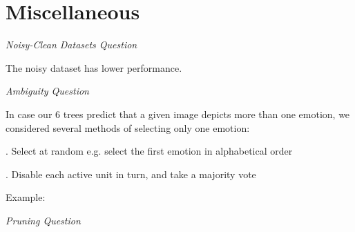 \documentclass[12pt, a4paper]{article}
\begin{document}
\section*{Miscellaneous}
\textit{Noisy-Clean Datasets Question}\par
\bigskip
The noisy dataset has lower performance.\par
\bigskip
\textit{Ambiguity Question}\par
\bigskip
In case our 6 trees predict that a given image depicts more than one emotion, we considered several methods of selecting only one emotion:\par
{}. Select at random e.g. select the first emotion in alphabetical order\par
{}. Disable each active unit in turn, and take a majority vote\par
Example:\par
\bigskip
\textit{Pruning Question}\par
\bigskip
\end{document}
